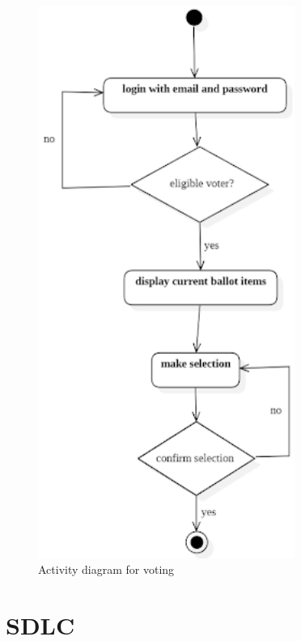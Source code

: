 \begin{figure}[H] %
\begin{center}
	\includegraphics[width = 3.3in]{images/Activity diagram for voting.png}
	\caption{Activity diagram for voting} %
	\label{figSample1} %
\end{center}
\end{figure}

\section{SDLC}

